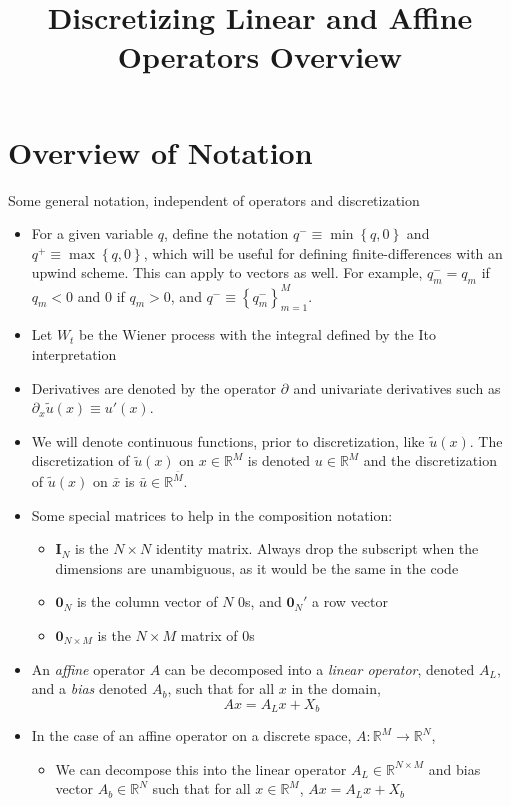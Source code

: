\documentclass[11pt]{article}
\newcommand{\set}[1]{\ensuremath{\left\{{#1}\right\}}}
\newcommand{\R}{\ensuremath{\mathbb{R}}}
\newcommand{\D}[1][]{\ensuremath{\partial_{#1}}}
\begin{document}
	\title{Discretizing Linear and Affine Operators Overview}
	\author{}
	\date{}
	\maketitle
	\section{Overview of Notation}
	Some general notation, independent of operators and discretization
	\begin{itemize}
		\item For a given variable $q$, define the notation $q^{-} \equiv \min\set{q,0}$ and $q^{+} \equiv \max\set{q,0}$, which will be useful for defining finite-differences with an upwind scheme.  This can apply to vectors as well. For example, $q_m^{-} = q_m$ if $q_m < 0$ and $0$ if $q_m > 0$, and $q^{-} \equiv \set{q^{-}_m}_{m=1}^{M}$.
		\item Let $W_t$ be the Wiener process with the integral defined by the Ito interpretation
		\item Derivatives are denoted by the operator $\D$ and univariate derivatives such as $\D[x]\tilde{u}(x) \equiv u'(x)$.
		\item We will denote continuous functions, prior to discretization, like $\tilde{u}(x)$.  The discretization of $\tilde{u}(x)$ on $x\in \R^M$ is denoted $u \in \R^M$ and the discretization of $\tilde{u}(x)$ on $\bar{x}$ is $\bar{u} \in \R^{\bar{M}}$.
		\item Some special matrices to help in the composition notation:
		\begin{itemize}
			\item $\mathbf{I}_N$ is the $N\times N$ identity matrix.  Always drop the subscript when the dimensions are unambiguous, as it would be the same in the code
			\item $\mathbf{0}_N$ is the column vector of $N$ $0$s, and $\mathbf{0}_N'$ a row vector
			\item $\mathbf{0}_{N\times M}$ is the $N\times M$ matrix of $0$s
		\end{itemize}
  	\item An \textit{affine} operator $A$ can be decomposed into a \textit{linear operator}, denoted $A_L$, and a \textit{bias} denoted $A_b$, such that for all $x$ in the domain,
		$$
		A x = A_L x + X_b
		$$
		\item In the case of an affine operator on a discrete space, $A : \R^M \to \R^N$,
		\begin{itemize}
			\item We can decompose this into the linear operator $A_L \in \R^{N\times M}$ and bias vector $A_b \in \R^{N}$ such that for all $x\in\R^M$, $A x = A_L x + X_b$
		\end{itemize}
	\end{itemize}
\end{document}
